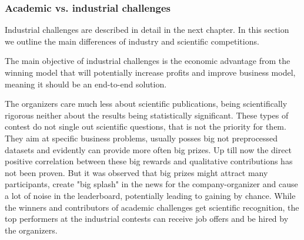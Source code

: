\documentclass[twoside,11pt]{article}
\begin{document}







\subsubsection{Academic vs. industrial challenges}
Industrial challenges are described in detail in the next chapter. In this section we  outline the main  differences of industry and scientific competitions. 

The main objective of industrial challenges is the economic advantage from the winning model that will potentially increase profits and improve business model, meaning it should be an end-to-end solution. %

The organizers care much less about scientific publications, being scientifically rigorous neither about the results being statistically significant. %
These types of contest do not single out scientific questions, that is not the priority for them. They aim at specific business problems, usually posses big not preprocessed datasets and evidently can provide more often big prizes. %
Up till now the direct positive correlation between these big rewards and qualitative contributions has not been proven. But it was observed that big prizes might attract many participants, create "big splash" in the news for the company-organizer and cause a lot of noise in the leaderboard, potentially leading to gaining by chance.%
While the winners and contributors of academic challenges get scientific recognition, the top performers at the industrial contests can receive job offers and be hired by the organizers. 
\end{document}
